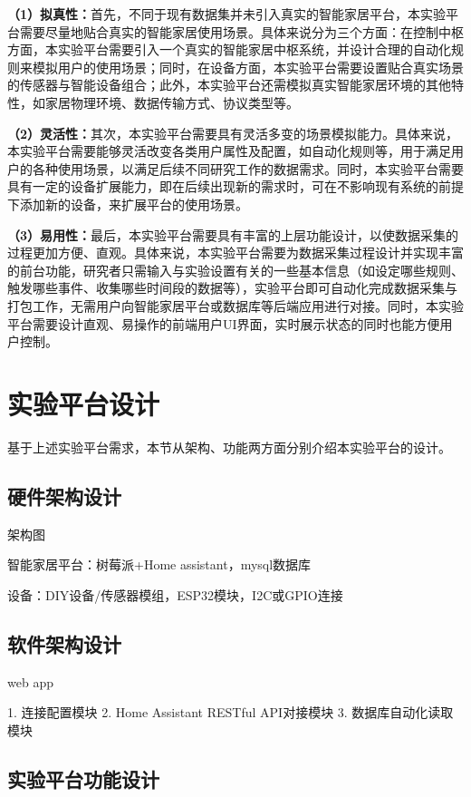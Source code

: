 \textbf{（1）拟真性：}首先，不同于现有数据集并未引入真实的智能家居平台，本实验平台需要尽量地贴合真实的智能家居使用场景。具体来说分为三个方面：在控制中枢方面，本实验平台需要引入一个真实的智能家居中枢系统，并设计合理的自动化规则来模拟用户的使用场景；同时，在设备方面，本实验平台需要设置贴合真实场景的传感器与智能设备组合；此外，本实验平台还需模拟真实智能家居环境的其他特性，如家居物理环境、数据传输方式、协议类型等。

\textbf{（2）灵活性：}其次，本实验平台需要具有灵活多变的场景模拟能力。具体来说，本实验平台需要能够灵活改变各类用户属性及配置，如自动化规则等，用于满足用户的各种使用场景，以满足后续不同研究工作的数据需求。同时，本实验平台需要具有一定的设备扩展能力，即在后续出现新的需求时，可在不影响现有系统的前提下添加新的设备，来扩展平台的使用场景。

\textbf{（3）易用性：}最后，本实验平台需要具有丰富的上层功能设计，以使数据采集的过程更加方便、直观。具体来说，本实验平台需要为数据采集过程设计并实现丰富的前台功能，研究者只需输入与实验设置有关的一些基本信息（如设定哪些规则、触发哪些事件、收集哪些时间段的数据等），实验平台即可自动化完成数据采集与打包工作，无需用户向智能家居平台或数据库等后端应用进行对接。同时，本实验平台需要设计直观、易操作的前端用户UI界面，实时展示状态的同时也能方便用户控制。

\section{实验平台设计}

基于上述实验平台需求，本节从架构、功能两方面分别介绍本实验平台的设计。

\subsection{硬件架构设计}

架构图

智能家居平台：树莓派+Home assistant，mysql数据库

设备：DIY设备/传感器模组，ESP32模块，I2C或GPIO连接

\subsection{软件架构设计}

web app

1. 连接配置模块
2. Home Assistant RESTful API对接模块
3. 数据库自动化读取模块

\subsection{实验平台功能设计}

